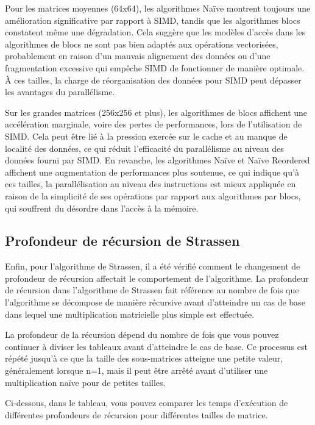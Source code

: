 \documentclass[../CSC_5RO06_TA.tex]{subfiles}
\begin{document}
Pour les matrices moyennes (64x64), les algorithmes Naïve montrent toujours une amélioration significative par rapport à SIMD, tandis que les algorithmes blocs constatent même une dégradation. Cela suggère que les modèles d'accès dans les algorithmes de blocs ne sont pas bien adaptés aux opérations vectorisées, probablement en raison d'un mauvais alignement des données ou d'une fragmentation excessive qui empêche SIMD de fonctionner de manière optimale. À ces tailles, la charge de réorganisation des données pour SIMD peut dépasser les avantages du parallélisme.

Sur les grandes matrices (256x256 et plus), les algorithmes de blocs affichent une accélération marginale, voire des pertes de performances, lors de l'utilisation de SIMD. Cela peut être lié à la pression exercée sur le cache et au manque de localité des données, ce qui réduit l'efficacité du parallélisme au niveau des données fourni par SIMD. En revanche, les algorithmes Naïve et Naïve Reordered affichent une augmentation de performances plus soutenue, ce qui indique qu'à ces tailles, la parallélisation au niveau des instructions est mieux appliquée en raison de la simplicité de ses opérations par rapport aux algorithmes par blocs, qui souffrent du désordre dans l'accès à la mémoire.


\subsection{Profondeur de récursion de Strassen}

Enfin, pour l’algorithme de Strassen, il a été vérifié comment le changement de profondeur de récursion affectait le comportement de l’algorithme.
La profondeur de récursion dans l'algorithme de Strassen fait référence au nombre de fois que l'algorithme se décompose de manière récursive avant d'atteindre un cas de base dans lequel une multiplication matricielle plus simple est effectuée.

La profondeur de la récursion dépend du nombre de fois que vous pouvez continuer à diviser les tableaux avant d'atteindre le cas de base. Ce processus est répété jusqu'à ce que la taille des sous-matrices atteigne une petite valeur, généralement lorsque n=1, mais il peut être arrêté avant d'utiliser une multiplication naïve pour de petites tailles.

Ci-dessous, dans le tableau, vous pouvez comparer les temps d'exécution de différentes profondeurs de récursion pour différentes tailles de matrice.
\end{document}
